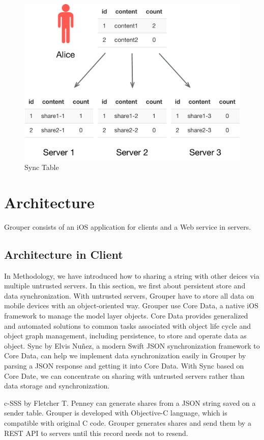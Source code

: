 \documentclass[twocolumn,10pt]{article}
\begin{document}
\begin{figure}[t]
\centering
\includegraphics[scale=0.4]{sync_table}
\caption{Sync Table}
\end{figure}

\section{Architecture}
Grouper consists of an iOS application for clients and a Web service in servers.

\subsection{Architecture in Client}
In Methodology, we have introduced how to sharing a string with other deices via multiple untrusted servers. In this section, we first about persistent store and data synchronization. With untrusted servers, Grouper have to store all data on mobile devices with an object-oriented way. Grouper use Core Data\cite{coredata}, a native iOS framework to manage the model layer objects. Core Data provides generalized and automated solutions to common tasks associated with object life cycle and object graph management, including persistence, to store and operate data as object. Sync\cite{sync} by Elvis Nuñez, a modern Swift JSON synchronization framework to Core Data, can help we implement data synchronization easily in Grouper by parsing a JSON response and getting it into Core Data. With Sync based on Core Date, we can concentrate on sharing with untrusted servers rather than data storage and synchronization.

c-SSS by Fletcher T. Penney can generate shares from a JSON string saved on a sender table. Grouper is developed with Objective-C language, which is compatible with original C code. Grouper generates shares and send them by a REST API to servers until this record needs not to resend.
\end{document}
